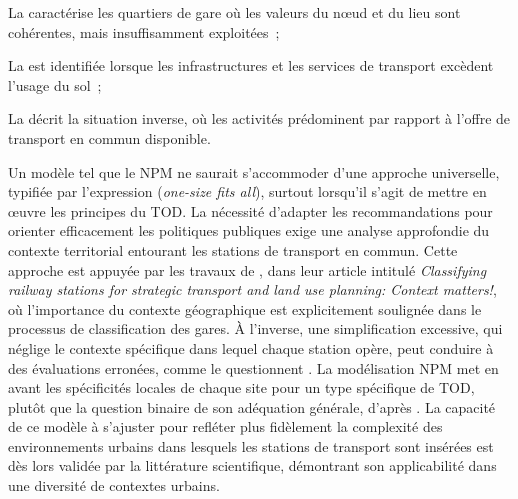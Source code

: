 \begin{refsegment}
\begin{customitemize}
    \item La  caractérise les quartiers de gare où les valeurs du nœud et du lieu sont cohérentes, mais insuffisamment exploitées~;
    \item La  est identifiée lorsque les infrastructures et les services de transport excèdent l'usage du sol~;
    \item La  décrit la situation inverse, où les activités prédominent par rapport à l'offre de transport en commun disponible.
\end{customitemize}%

Un modèle tel que le \acrshort{NPM} ne saurait s'accommoder d'une approche universelle, typifiée par l'expression  (\textsl{one-size fits all}), surtout lorsqu'il s'agit de mettre en œuvre les principes du \acrshort{TOD}. La nécessité d'adapter les recommandations pour orienter efficacement les politiques publiques exige une analyse approfondie du contexte territorial entourant les stations de transport en commun. Cette approche est appuyée par les travaux de \textcolor{blue}{\textcite[678-679]{zemp_classifying_2011}}, dans leur article intitulé \foreignlanguage{english}{\textsl{Classifying railway stations for strategic transport and land use planning: Context matters!}}, où l'importance du contexte géographique est explicitement soulignée dans le processus de classification des gares. À l'inverse, une simplification excessive, qui néglige le contexte spécifique dans lequel chaque station opère, peut conduire à des évaluations erronées, comme le questionnent \textcolor{blue}{\textcite[2]{cao_coordination_2020}}. La modélisation \acrshort{NPM} met en avant les spécificités locales de chaque site pour un type spécifique de \acrshort{TOD}, plutôt que la question binaire de son adéquation générale, d'après \textcolor{blue}{\textcite[55]{kamruzzaman_advance_2014}}. La capacité de ce modèle à s'ajuster pour refléter plus fidèlement la complexité des environnements urbains dans lesquels les stations de transport sont insérées est dès lors validée par la littérature scientifique, démontrant son applicabilité dans une diversité de contextes urbains.%


\end{refsegment}
